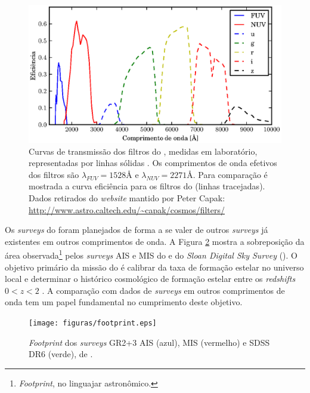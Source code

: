\begin{figure}
	\includegraphics{figuras/galex-filters.eps}
	\caption[Curvas de transmissão dos filtros do \galex.]
	{Curvas de transmissão dos filtros do \galex, medidas em
	laboratório, representadas por linhas sólidas \citep{Morrissey2005}. Os
	comprimentos de onda efetivos dos filtros são $\lambda_{FUV}=1528\text{\AA}$ e
	$\lambda_{NUV}=2271\text{\AA}$. Para comparação é mostrada a curva eficiência
	para os filtros do \SDSS (linhas tracejadas). Dados retirados do {\em
	website} mantido por Peter Capak:
	\url{http://www.astro.caltech.edu/~capak/cosmos/filters/}}
	\label{fig:GalexFilters}
\end{figure}

Os {\em surveys} do \galex foram planejados de forma a se valer de outros {\em
surveys} já existentes em outros comprimentos de onda. A Figura
\ref{fig:GalexSDSSOverlap} mostra a sobreposição da área observada\footnote{{\em
Footprint}, no linguajar astronômico.} pelos {\em surveys} AIS e MIS do \galex e
do {\em Sloan Digital Sky Survey} (\SDSS). O objetivo primário da missão do
\galex é calibrar da taxa de formação estelar no universo local e determinar o
histórico cosmológico de formação estelar entre os {\em redshifts} $0 < z < 2$
\citep{Martin2005}. A comparação com dados de {\em surveys} em outros
comprimentos de onda tem um papel fundamental no cumprimento deste objetivo.

\begin{figure}
	\texttt{[image: figuras/footprint.eps]}
	\caption[{\em Footprint} dos {\em surveys} \galex AIS, MIS e SDSS]
	{{\em Footprint} dos {\em surveys} \galex GR2+3 AIS (azul), MIS (vermelho) e
	SDSS DR6 (verde), de \citet{Budavari2009}.}
	\label{fig:GalexSDSSOverlap}
\end{figure}



